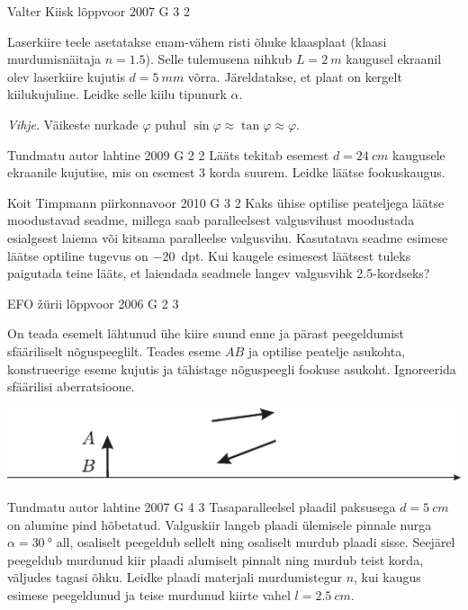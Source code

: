 \documentclass[11pt]{article}
\begin{document}
{%
{Valter Kiisk} %
{lõppvoor} %
{2007} %
{G 3} %
{2} %
{
\ifStatement
Laserkiire teele asetatakse enam-vähem risti õhuke klaasplaat (klaasi murdumisnäitaja $n = \num{1,5}$). Selle tulemusena nihkub $L = \SI{2}{m}$ kaugusel ekraanil olev laserkiire kujutis $d = \SI{5}{mm}$ võrra. Järeldatakse, et plaat on kergelt kiilukujuline. Leidke selle kiilu tipunurk $\alpha$. 

\emph{Vihje}. Väikeste nurkade $\varphi$ puhul $\sin \varphi \approx \tan \varphi \approx \varphi$.
\fi
}

{Tundmatu autor} %
{lahtine} %
{2009} %
{G 2} %
{2} %
{
\ifStatement
Lääts tekitab esemest $d = \SI{24}{cm}$ kaugusele ekraanile kujutise, mis on esemest \num{3} korda suurem. Leidke läätse fookuskaugus.
\fi
}

{Koit Timpmann} %
{piirkonnavoor} %
{2010} %
{G 3} %
{2} %
{
\ifStatement
Kaks ühise optilise peateljega läätse moodustavad seadme, millega saab paralleelsest valgusvihust moodustada esialgsest laiema või kitsama paralleelse valgusvihu. Kasutatava seadme esimese läätse optiline tugevus on \SI{-20}{dpt}. Kui kaugele esimesest läätsest tuleks paigutada teine lääts, et laiendada seadmele langev valgusvihk \num{2.5}-kordseks?
\fi
}

{EFO žürii} %
{lõppvoor} %
{2006} %
{G 2} %
{3} %
{
\ifStatement
On teada esemelt lähtunud ühe kiire suund enne ja pärast peegeldumist sfääriliselt nõguspeeglilt. Teades eseme $AB$ ja optilise peatelje asukohta, konstrueerige eseme kujutis ja tähistage nõguspeegli fookuse asukoht. Ignoreerida sfäärilisi aberratsioone.

\begin{center}
	\includegraphics[width=0.9\linewidth]{2006-v3g-02-yl}
\end{center}
\fi
}

{Tundmatu autor} %
{lahtine} %
{2007} %
{G 4} %
{3} %
{
\ifStatement
Tasaparalleelsel plaadil paksusega $d = \SI{5}{cm}$ on alumine pind hõbetatud. Valguskiir langeb plaadi ülemisele pinnale nurga $\alpha = \SI{30}{\degree}$ all, osaliselt peegeldub sellelt ning osaliselt murdub plaadi sisse. Seejärel peegeldub murdunud kiir plaadi alumiselt pinnalt ning murdub teist korda, väljudes tagasi õhku. Leidke plaadi materjali murdumistegur $n$, kui kaugus esimese peegeldunud ja teise murdunud kiirte vahel $l = \SI{2,5}{cm}$.
\fi
}

}
\end{document}
